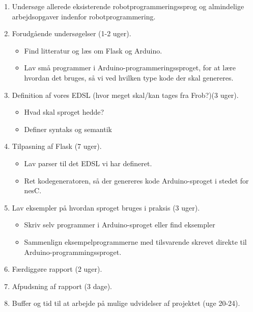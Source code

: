 \documentclass[a4paper,oneside, draft]{memoir}
\begin{document}
\begin{enumerate}

\item Undersøge allerede eksisterende robotprogrammeringssprog og almindelige
  arbejdsopgaver indenfor robotprogrammering.

\item Forudgående undersøgelser (1-2 uger).
  
  \begin{itemize}
  \item Find litteratur og læs om Flask og Arduino.
  \item Lav små programmer i Arduino-programmeringssproget, for at
    lære hvordan det bruges, så vi ved hvilken type kode der skal genereres.    
  \end{itemize}

\item Definition af vores EDSL (hvor meget skal/kan tages fra
  Frob?)(3 uger).   \label{item:opgaver:definer-syntaks}
  \begin{itemize}
  \item Hvad skal sproget hedde?
  \item Definer syntaks og semantik
  \end{itemize}

\item Tilpasning af Flask (7 uger).
  \begin{itemize}
  \item Lav parser til det EDSL vi har defineret.
  \item Ret kodegeneratoren, så der genereres kode Arduino-sproget i
    stedet for nesC.
  \end{itemize}


\item Lav eksempler på hvordan sproget bruges i praksis (3 uger).
  \label{item:opgaver:lav-eksempler}

  \begin{itemize}
  \item Skriv selv programmer i Arduino-sproget eller find eksempler
  \item Sammenlign eksempelprogrammerne med tilsvarende skrevet direkte til
    Arduino-programmingssproget.  
  \end{itemize}
    
\item Færdiggøre rapport (2 uger).
  
\item Afpudsning af rapport (3 dage).
  
\item Buffer og tid til at arbejde på mulige udvidelser af projektet (uge 20-24).
\end{enumerate}
\end{document}
